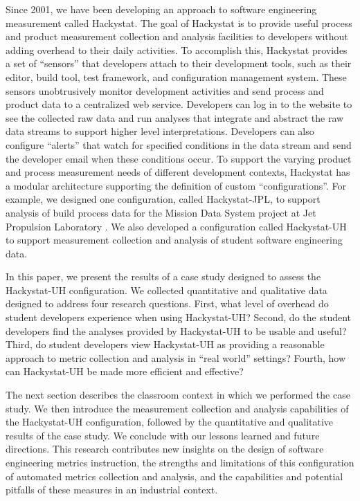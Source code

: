 \documentclass[10pt,twocolumn]{article}
\begin{document}
Since 2001, we have been developing an approach to software engineering
measurement called Hackystat. The goal of Hackystat is to provide useful
process and product measurement collection and analysis facilities to
developers without adding overhead to their daily activities. To accomplish
this, Hackystat provides a set of ``sensors'' that developers attach to
their development tools, such as their editor, build tool, test framework,
and configuration management system. These sensors unobtrusively monitor
development activities and send process and product data to a centralized
web service.  Developers can log in to the website to see the collected raw
data and run analyses that integrate and abstract the raw data streams to
support higher level interpretations.  Developers can also configure
``alerts'' that watch for specified conditions in the data stream and send
the developer email when these conditions occur.  To support the varying
product and process measurement needs of different development contexts,
Hackystat has a modular architecture supporting the definition of custom
``configurations''.  For example, we designed one configuration, called
Hackystat-JPL, to support analysis of build process data for the Mission
Data System project at Jet Propulsion Laboratory \cite{csdl2-03-07}.  We
also developed a configuration called Hackystat-UH to support measurement
collection and analysis of student software engineering data.

In this paper, we present the results of a case study designed to assess
the Hackystat-UH configuration.  We collected quantitative and qualitative
data designed to address four research questions.  First, what level of
overhead do student developers experience when using Hackystat-UH? Second,
do the student developers find the analyses provided by Hackystat-UH to be
usable and useful? Third, do student developers view Hackystat-UH as
providing a reasonable approach to metric collection and analysis in ``real
world'' settings?  Fourth, how can Hackystat-UH be made more efficient and
effective?

The next section describes the classroom context in which we performed the
case study.  We then introduce the measurement collection and analysis
capabilities of the Hackystat-UH configuration, followed by the
quantitative and qualitative results of the case study. We conclude with
our lessons learned and future directions.  This research contributes new
insights on the design of software engineering metrics instruction, the
strengths and limitations of this configuration of automated metrics
collection and analysis, and the capabilities and potential pitfalls of
these measures in an industrial context.
\end{document}

